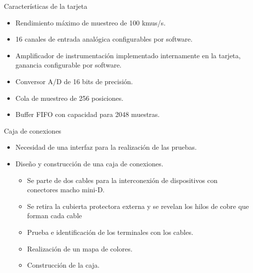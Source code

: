 \documentclass[utf8, compress]			{beamer}
\begin{document}
\begin{frame}{Características de la tarjeta}
    \begin{itemize}
	\item Rendimiento máximo de muestreo de 100 kmus/s.
	\item 16 canales de entrada analógica configurables por software.
	\item Amplificador de instrumentación implementado internamente en
	    la tarjeta, ganancia configurable por software.
	\item Conversor A/D de 16 bits de precisión.
	\item Cola de muestreo de 256 posiciones.
	\item Buffer FIFO con capacidad para 2048 muestras.
    \end{itemize}
\end{frame}

\begin{frame}{Caja de conexiones}
    \begin{itemize}
	\item Necesidad de una interfaz para la realización de las pruebas.
	\item Diseño y construcción de una caja de conexiones.
	    \begin{itemize}
		\item Se parte de dos cables para la interconexión de
		    dispositivos con conectores macho mini-D.
		\item Se retira la cubierta protectora externa y se revelan
		    los hilos de cobre que forman cada cable
		\item Prueba e identificación de los terminales con los
		    cables.
		\item Realización de un mapa de colores.
		\item Construcción de la caja.
	    \end{itemize}
    \end{itemize}
\end{frame}

\newlength{\exterior}
\settoheight{}
\end{document}
